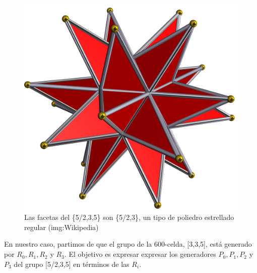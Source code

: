 \documentclass[spanish]{article}
\theoremstyle{definition}
\begin{document}
\begin{figure}[H]
	\centering
	\includegraphics[width=0.4\linewidth]{p9}
	\caption*{\small{Las facetas del \{5/2,3,5\} son \{5/2,3\}, un tipo de poliedro estrellado regular (img:Wikipedia)}}
\end{figure}


En nuestro caso, partimos de que el grupo de la 600-celda, [3,3,5], está generado por $R_0,R_1,R_2$ y $R_3$. El objetivo es expresar expresar los generadores $P_0,P_1,P_2$ y $P_3$ del grupo [5/2,3,5] en términos de las $R_i$.
\end{document}
